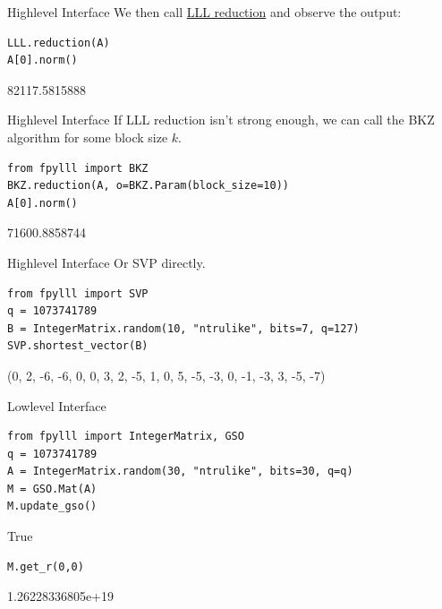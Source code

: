 \documentclass[presentation,smaller]{beamer}
\begin{document}
\begin{frame}[fragile,label={sec:orgheadline4}]{Highlevel Interface}
 We then call \href{https://en.wikipedia.org/wiki/Lenstra–Lenstra–Lovász_lattice_basis_reduction_algorithm}{LLL reduction} and observe the output:

\lstset{language=Python,label= ,caption= ,captionpos=b,numbers=none}
\begin{lstlisting}
LLL.reduction(A)
A[0].norm()
\end{lstlisting}

82117.5815888
\end{frame}

\begin{frame}[fragile,label={sec:orgheadline5}]{Highlevel Interface}
 If LLL reduction isn’t strong enough, we can call the BKZ algorithm for some block size \(k\).

\lstset{language=Python,label= ,caption= ,captionpos=b,numbers=none}
\begin{lstlisting}
from fpylll import BKZ
BKZ.reduction(A, o=BKZ.Param(block_size=10))
A[0].norm()
\end{lstlisting}

71600.8858744
\end{frame}

\begin{frame}[fragile,label={sec:orgheadline6}]{Highlevel Interface}
 Or SVP directly.

\lstset{language=Python,label= ,caption= ,captionpos=b,numbers=none}
\begin{lstlisting}
from fpylll import SVP
q = 1073741789
B = IntegerMatrix.random(10, "ntrulike", bits=7, q=127)
SVP.shortest_vector(B)
\end{lstlisting}

(0, 2, -6, -6, 0, 0, 3, 2, -5, 1, 0, 5, -5, -3, 0, -1, -3, 3, -5, -7)
\end{frame}

\begin{frame}[fragile,label={sec:orgheadline7}]{Lowlevel Interface}
 \lstset{language=Python,label= ,caption= ,captionpos=b,numbers=none}
\begin{lstlisting}
from fpylll import IntegerMatrix, GSO
q = 1073741789
A = IntegerMatrix.random(30, "ntrulike", bits=30, q=q)
M = GSO.Mat(A)
M.update_gso()
\end{lstlisting}

True


\lstset{language=Python,label= ,caption= ,captionpos=b,numbers=none}
\begin{lstlisting}
M.get_r(0,0)
\end{lstlisting}

1.26228336805e+19
\end{frame}
\end{document}
